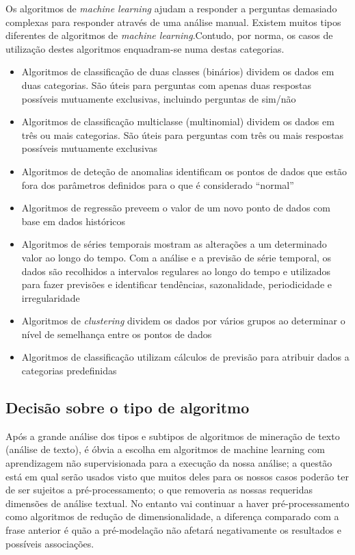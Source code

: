 \documentclass[a4paper,10pt]{article}
\begin{document}
Os algoritmos de \textit{machine learning} ajudam a responder a perguntas demasiado complexas para responder através de uma análise manual.
Existem muitos tipos diferentes de algoritmos de \textit{machine learning}.Contudo, por norma, os casos de utilização destes algoritmos enquadram-se numa destas categorias.
\begin{itemize}
    \item Algoritmos de classificação de duas classes (binários) dividem os dados em duas categorias. São úteis para perguntas com apenas duas respostas possíveis mutuamente exclusivas, incluindo perguntas de sim/não
    \item Algoritmos de classificação multiclasse (multinomial) dividem os dados em três ou mais categorias. São úteis para perguntas com três ou mais respostas possíveis mutuamente exclusivas
    \item Algoritmos de deteção de anomalias identificam os pontos de dados que estão fora dos parâmetros definidos para o que é considerado ``normal''
    \item Algoritmos de regressão preveem o valor de um novo ponto de dados com base em dados históricos
    \item Algoritmos de séries temporais mostram as alterações a um determinado valor ao longo do tempo. Com a análise e a previsão de série temporal, os dados são recolhidos a intervalos regulares ao longo do tempo e utilizados para fazer previsões e identificar tendências, sazonalidade, periodicidade e irregularidade
    \item Algoritmos de \textit{clustering} dividem os dados por vários grupos ao determinar o nível de semelhança entre os pontos de dados
    \item Algoritmos de classificação utilizam cálculos de previsão para atribuir dados a categorias predefinidas
\end{itemize}

\subsection{Decisão sobre o tipo de algoritmo}

Após a grande análise dos tipos e subtipos de algoritmos de mineração de texto (análise de texto), é óbvia a escolha em algoritmos de machine learning com aprendizagem não supervisionada para a execução da nossa análise; a questão está em qual serão usados visto que muitos deles para os nossos casos poderão ter de ser sujeitos a pré-processamento; o que removeria as nossas requeridas dimensões de análise textual.
No entanto vai continuar a haver pré-processamento como algoritmos de redução de dimensionalidade, a diferença comparado com a frase anterior é quão a pré-modelação não afetará negativamente os resultados e possíveis associações.
\end{document}
